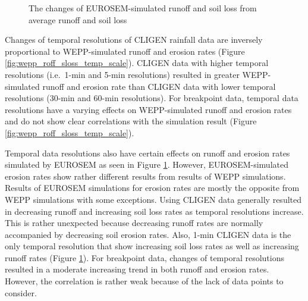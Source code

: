 \begin{figure}[p]
  \centering
  \caption{The changes of EUROSEM-simulated runoff and soil loss from average
runoff and soil loss}
  \label{fig:eurosem_roff_sloss_temp_scale}
\end{figure}

Changes of temporal resolutions of CLIGEN rainfall data are inversely
proportional
to WEPP-simulated runoff and erosion rates (Figure
\ref{fig:wepp_roff_sloss_temp_scale}). CLIGEN data with higher temporal
resolutions (i.e.\ 1-min and 5-min resolutions) resulted in greater
WEPP-simulated
runoff and erosion rate than CLIGEN data with lower temporal resolutions (30-min
and 60-min resolutions). For breakpoint data, temporal data resolutions have a
varying
effects on WEPP-simulated runoff and erosion rates and do not show clear
correlations with the simulation result (Figure
\ref{fig:wepp_roff_sloss_temp_scale}).

Temporal data resolutions also have certain effects on runoff and erosion rates
simulated by EUROSEM as seen in Figure \ref{fig:eurosem_roff_sloss_temp_scale}.
However, EUROSEM-simulated erosion rates show rather different results from
results of WEPP simulations. Results of EUROSEM simulations for erosion rates
are mostly the opposite from WEPP simulations with some exceptions. Using CLIGEN
data generally resulted in decreasing runoff and increasing soil loss rates as
temporal resolutions increase. This is rather unexpected because decreasing
runoff
rates are normally accompanied by decreasing soil erosion rates. Also, 1-min
CLIGEN data is the only temporal resolution that show increasing soil loss rates
as
well as increasing runoff rates (Figure
\ref{fig:eurosem_roff_sloss_temp_scale}). For breakpoint data, changes of
temporal resolutions resulted in a moderate increasing trend in both runoff and
erosion rates. However, the correlation is rather weak because of the lack of
data points to consider.

